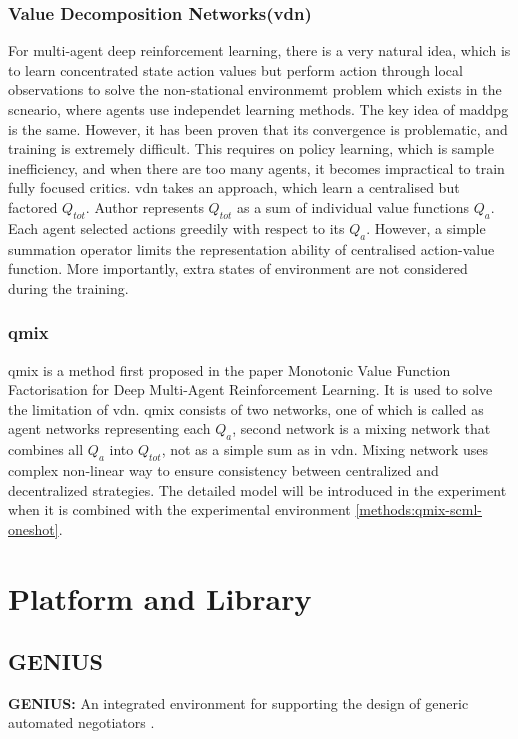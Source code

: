 \subsubsection{Value Decomposition Networks(\gls{vdn})}
For multi-agent deep reinforcement learning, there is a very natural idea, which is to learn concentrated state action values but perform action through local observations to solve the non-stational environmemt problem which exists in the scneario, where agents use independet learning methods. The key idea of \gls{maddpg} is the same. However, it has been proven that its convergence is problematic, and training is extremely difficult. This requires on policy learning, which is sample inefficiency, and when there are too many agents, it becomes impractical to train fully focused critics. \gls{vdn}\parencite{Sunehag2017} takes an approach, which learn a centralised but factored $Q_{tot}$. Author represents $Q_{tot}$ as a sum of individual value functions $Q_a$. Each agent selected actions greedily with respect to its $Q_a$. However, a simple summation operator limits the representation ability of centralised action-value function. More importantly, extra states of environment are not considered during the training.

\subsubsection{\gls{qmix}}
\gls{qmix} is a method first proposed in the paper Monotonic Value Function Factorisation for Deep Multi-Agent Reinforcement Learning\parencite{Rashid2018}. It is used to solve the limitation of \gls{vdn}. \gls{qmix} consists of two networks, one of which is called as agent networks representing each $Q_a$, second network is a mixing network that combines all $Q_a$ into $Q_{tot}$, not as a simple sum as in \gls{vdn}. Mixing network uses complex non-linear way to ensure consistency between centralized and decentralized strategies. The detailed model will be introduced in the experiment when it is combined with the experimental environment \ref{methods:qmix-scml-oneshot}.

\section{Platform and Library}
\subsection{GENIUS}
\textbf{GENIUS:} An integrated environment for supporting the design of generic automated negotiators \parencite{Lin2014}.

